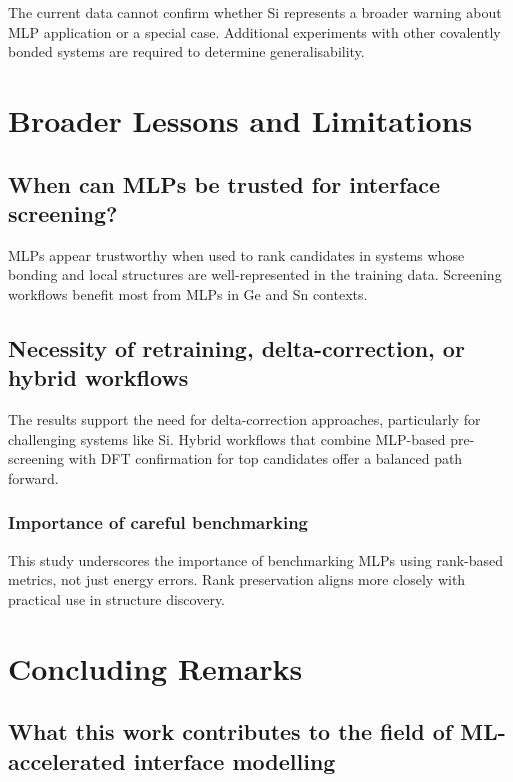 The current data cannot confirm whether Si represents a broader warning about MLP application or a special case.
Additional experiments with other covalently bonded systems are required to determine generalisability.

\section{Broader Lessons and Limitations}
\label{section:broader_lessons_and_limitations}

\subsection{When can MLPs be trusted for interface screening?}

MLPs appear trustworthy when used to rank candidates in systems whose bonding and local structures are well-represented
in the training data. Screening workflows benefit most from MLPs in Ge and Sn contexts.

\subsection{Necessity of retraining, delta-correction, or hybrid workflows}

The results support the need for delta-correction approaches, particularly for challenging systems like Si. Hybrid
workflows that combine MLP-based pre-screening with DFT confirmation for top candidates offer a balanced path forward.


\subsubsection{Importance of careful benchmarking}

This study underscores the importance of benchmarking MLPs using rank-based metrics, not just energy errors. Rank
preservation aligns more closely with practical use in structure discovery.

\section{Concluding Remarks}
\label{section:concluding_remarks}

\subsection{What this work contributes to the field of ML-accelerated interface modelling}


